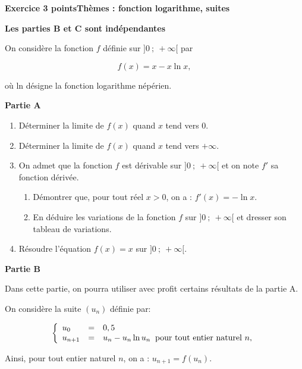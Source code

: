 \documentclass[10pt,a4paper]{article}
\begin{document}
\bigskip

\textbf{Exercice 3  points\hfill Thèmes : fonction logarithme, suites}

\medskip

\textbf{Les parties B et C sont indépendantes}

\medskip

On considère la fonction $f$  définie sur $]0~;~+\infty[$ par 

\[f(x) = x - x \ln x,\]

où ln désigne la fonction logarithme népérien.

\bigskip

\textbf{Partie A}

\medskip

\begin{enumerate}
\item Déterminer la limite de $f(x)$ quand $x$ tend vers $0$.
\item Déterminer la limite de $f(x)$ quand $x$ tend vers $+\infty$.
\item On admet que la fonction $f$ est dérivable sur $]0~;~+\infty[$ et on note $f'$ sa fonction dérivée.
	\begin{enumerate}
		\item Démontrer que, pour tout réel $x > 0$, on a : $f'(x) = - \ln x$.
		\item En déduire les variations de la fonction $f$ sur $]0~;~+\infty[$ et dresser son tableau de variations.
	\end{enumerate}
\item Résoudre l'équation $f(x) = x$ sur $]0~;~+\infty[$.
\end{enumerate}

\bigskip

\textbf{Partie B}

\medskip

Dans cette partie, on pourra utiliser avec profit certains résultats de la partie A. 

On considère la suite $\left(u_n\right)$ définie par:

\[\left\{\begin{array}{l c l}
u_0 &=& 0,5\\
u_{n+1} &=& u_n - u_n \ln u_n \:\text{ pour tout entier naturel } n,
\end{array}\right.\]

Ainsi, pour tout entier naturel $n$, on a : $u_{n+1} = f\left(u_n\right)$.
\end{document}
